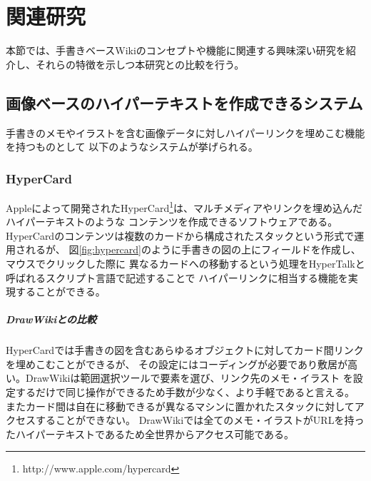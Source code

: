 \chapter{関連研究}
\label{chap:kanren}

本節では、手書きベースWikiのコンセプトや機能に関連する興味深い研究を紹介し、それらの特徴を示しつ本研究との比較を行う。
\newpage


%

\section{画像ベースのハイパーテキストを作成できるシステム}
\label{hyperillustcreators}
手書きのメモやイラストを含む画像データに対しハイパーリンクを埋めこむ機能を持つものとして
以下のようなシステムが挙げられる。

\subsection{HyperCard}
Appleによって開発されたHyperCard\footnote{http://www.apple.com/hypercard}は、マルチメディアやリンクを埋め込んだハイパーテキストのような
コンテンツを作成できるソフトウェアである。
HyperCardのコンテンツは複数のカードから構成されたスタックという形式で運用されるが、
図\ref{fig:hypercard}のように手書きの図の上にフィールドを作成し、マウスでクリックした際に
異なるカードへの移動するという処理をHyperTalkと呼ばれるスクリプト言語で記述することで
ハイパーリンクに相当する機能を実現することができる。

\paragraph*{DrawWikiとの比較}
HyperCardでは手書きの図を含むあらゆるオブジェクトに対してカード間リンクを埋めこむことができるが、
その設定にはコーディングが必要であり敷居が高い。DrawWikiは範囲選択ツールで要素を選び、リンク先のメモ・イラスト
を設定するだけで同じ操作ができるため手数が少なく、より手軽であると言える。
またカード間は自在に移動できるが異なるマシンに置かれたスタックに対してアクセスすることができない。
DrawWikiでは全てのメモ・イラストがURLを持ったハイパーテキストであるため全世界からアクセス可能である。

